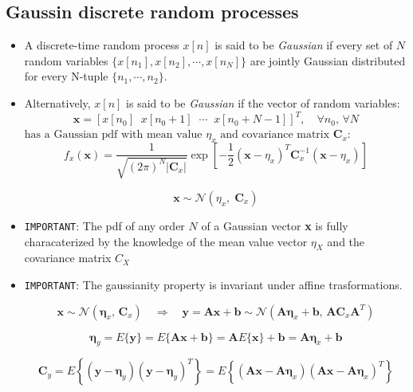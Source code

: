 \subsection{Gaussin discrete random processes}
\begin{itemize}
    \item A discrete-time random process \(x[n]\) is said to be \textit{Gaussian} if every set of \(N\) random variables \(\{x[n_1],x[n_2],\cdots,x[n_N]\}\) are jointly Gaussian distributed for every N-tuple \(\{n_1,\cdots,n_2\}\).
    \item Alternatively, \(x[n]\) is said to be \textit{Gaussian} if the vector of random variables:
    \[
\mathbf{x} = \left[ x[n_0]\;\; x[n_0+1]\;\; \cdots\;\; x[n_0+N-1] \right]^T,\quad \forall n_0,\, \forall N
\]
\(
\text{has a Gaussian pdf with mean value } \eta_x \text{ and covariance matrix } \mathbf{C}_x \text{:}
\)
\[
f_x(\mathbf{x}) = \frac{1}{\sqrt{(2\pi)^N|\mathbf{C}_x|}} \exp\left[ -\frac{1}{2} (\mathbf{x} - \eta_x)^T \mathbf{C}_x^{-1} (\mathbf{x} - \eta_x) \right]
\]

\[
\mathbf{x} \sim \mathcal{N}\left( \eta_x,\; \mathbf{C}_x \right)
\]

\item \texttt{IMPORTANT}: The pdf of any order \(N\) of a Gaussian vector \textbf{x} is fully characaterized by the knowledge of the mean value vector \(\eta_X\) and the covariance matrix \(C_X\)
\item \texttt{IMPORTANT}: The gaussianity property is invariant under affine trasformations.

\[
\mathbf{x} \sim \mathcal{N}(\mathbf{\eta}_x,\, \mathbf{C}_x)
\quad \Longrightarrow \quad
\mathbf{y} = \mathbf{A}\mathbf{x} + \mathbf{b} \sim \mathcal{N}(\mathbf{A}\mathbf{\eta}_x + \mathbf{b},\, \mathbf{A}\mathbf{C}_x\mathbf{A}^T)
\]

\[
\mathbf{\eta}_y = E\{\mathbf{y}\} = E\{\mathbf{A}\mathbf{x} + \mathbf{b}\} = \mathbf{A}E\{\mathbf{x}\} + \mathbf{b} = \mathbf{A}\mathbf{\eta}_x + \mathbf{b}
\]

\[
\mathbf{C}_y = E\left\{ (\mathbf{y} - \mathbf{\eta}_y)(\mathbf{y} - \mathbf{\eta}_y)^T \right\}
= E\left\{ (\mathbf{A}\mathbf{x} - \mathbf{A}\mathbf{\eta}_x) (\mathbf{A}\mathbf{x} - \mathbf{A}\mathbf{\eta}_x)^T \right\}
\]


\end{itemize}
